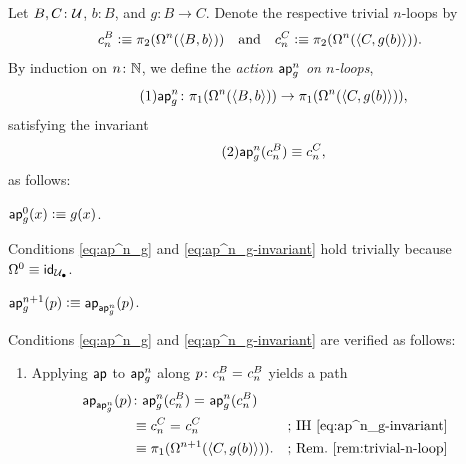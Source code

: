 \begin{defn}\label{defn:ap-n}
    Let $B,C\colon\univ$, $b\colon B$, and $g\colon B\to C$. Denote the respective trivial $n$-loops by
    \[
        c_n^B\mathrel{\vcentcolon}\equiv\pi_2(\Omega^n(\langle B,b\rangle))
        \quad\text{and}\quad
        c_n^C\mathrel{\vcentcolon}\equiv\pi_2(\Omega^n(\langle C,g(b)\rangle)).
    \]
    By induction on $n\colon\N$, we define the \textsl{action $\mathsf{ap}^n_g$ on $n$-loops},
    \begin{equation}\label{eq:ap^n_g}\tag{1}
        \fun{ap}^n_g\colon
            \pi_1(\Omega^n(\dep{B,b}))
            \to
            \pi_1(\Omega^n(\dep{C,g(b)})),
    \end{equation}
    satisfying the invariant
    \begin{equation}\label{eq:ap^n_g-invariant}\tag{2}
        \mathsf{ap}^n_g(c_n^B)\equiv c_n^C,
    \end{equation}
    as follows:
    \begin{description}[font=\normalfont\scshape]
        \item[Base Case ($n=0$):] $\mathsf{ap}^0_g(x)\mathrel{\vcentcolon}\equiv g(x)$.
        
        Conditions \eqref{eq:ap^n_g} and \eqref{eq:ap^n_g-invariant} hold trivially because $\Omega^0\equiv\id_\puniv$.

        \item[Inductive Step ($n\mapsto n+1$):] $\mathsf{ap}^{n+1}_g(p)\mathrel{\vcentcolon}\equiv\mathsf{ap}_{\mathsf{ap}^n_g}(p)$.

        Conditions \eqref{eq:ap^n_g} and \eqref{eq:ap^n_g-invariant} are verified as follows:
        \begin{enumerate}[(1)]
            \item Applying $\mathsf{ap}$ to $\mathsf{ap}^n_g$ along $p\colon c_n^B\eq{}c_n^B$ yields a path
            \begin{align*}
                \fun{ap}_{\fun{ap}^n_g}(p)
                    &\colon
                        \fun{ap}^n_g(c_n^B)
                        \eq{}
                        \fun{ap}^n_g(c_n^B)\\
                    &\equiv c_n^C\eq{}c_n^C
                    &&\text{; IH~\eqref{eq:ap^n_g-invariant}}\\
                    &\equiv\pi_1(
                        \Omega^{n+1}(\dep{C,g(b)})
                    ).
                    &&\text{; Rem.~\ref{rem:trivial-n-loop}}
            \end{align*}


\end{enumerate}
\end{description}
\end{defn}

